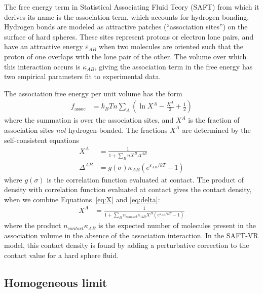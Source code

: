 \documentclass[letterpaper,twocolumn,amsmath,amssymb,jcp,10pt,aip]{revtex4-1}
\begin{document}
\newcommand\epsilonassoc{\ensuremath{\varepsilon_\textit{AB}}}
\newcommand\kappaassoc{\ensuremath{\kappa_\textit{AB}}}
\newcommand\ncontact{\ensuremath{n_\textit{contact}}}

The free energy term in Statistical Associating Fluid Teory (SAFT)
from which it derives its name is the association term, which accounts
for hydrogen bonding.  Hydrogen bonds are modeled as attractive
patches (``association sites'') on the surface of hard spheres.  These
sites represent protons or electron lone pairs, and have an attractive
energy $\epsilonassoc$ when two molecules are oriented such that the
proton of one overlaps with the lone pair of the other.  The volume
over which this interaction occurs is $\kappaassoc$, giving the
association term in the free energy has two empirical parameters fit
to experimental data.

The association free energy per unit volume has the form
\begin{align}
  f_\text{assoc} &= k_BT n\sum_A 
                  \left(\ln X^A - \frac{X^A}{2} + \frac12\right)
\end{align}
where the summation is over the association sites, and $X^A$ is the
fraction of association sites \emph{not} hydrogen-bonded.  The
fractions $X^A$ are determined by the self-consistent equations
\begin{align}
  X^A &= \frac{1}
  {1 + \sum_B n X^B \Delta^{AB}}\label{eq:X}
  \\
  \Delta^{AB} &= g(\sigma) \kappaassoc\left( e^{\epsilonassoc/kT} -
  1 \right)\label{eq:delta}
\end{align}
where $g(\sigma)$ is the correlation function evaluated at contact.
The product of density with correlation function evaluated at contact
gives the contact density, when we combine Equations~\ref{eq:X} and
\ref{eq:delta}:
\begin{align}
  X^A &= \frac{1}
  {1 + \sum_B \ncontact\kappaassoc X^B\left( e^{\epsilonassoc/kT} -
  1 \right)}
\end{align}
where the product $\ncontact\kappaassoc$ is the expected number of
molecules present in the association volume in the absence of the
association interaction.  In the SAFT-VR
model\cite{gil-villegas-1997-SAFT-VR}, this contact density is found
by adding a perturbative correction to the contact value for a hard
sphere fluid.

\subsection{Homogeneous limit}
\end{document}
